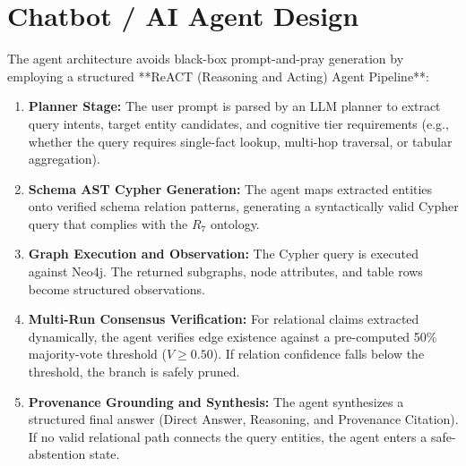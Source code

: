 \documentclass[12pt,a4paper,oneside]{report}
\begin{document}
\section{Chatbot / AI Agent Design}
The agent architecture avoids black-box prompt-and-pray generation by employing a structured **ReACT (Reasoning and Acting) Agent Pipeline**:
\begin{enumerate}
    \item \textbf{Planner Stage:} The user prompt is parsed by an LLM planner to extract query intents, target entity candidates, and cognitive tier requirements (e.g., whether the query requires single-fact lookup, multi-hop traversal, or tabular aggregation).
    \item \textbf{Schema AST Cypher Generation:} The agent maps extracted entities onto verified schema relation patterns, generating a syntactically valid Cypher query that complies with the $R_7$ ontology.
    \item \textbf{Graph Execution and Observation:} The Cypher query is executed against Neo4j. The returned subgraphs, node attributes, and table rows become structured observations.
    \item \textbf{Multi-Run Consensus Verification:} For relational claims extracted dynamically, the agent verifies edge existence against a pre-computed 50\% majority-vote threshold ($V \ge 0.50$). If relation confidence falls below the threshold, the branch is safely pruned.
    \item \textbf{Provenance Grounding and Synthesis:} The agent synthesizes a structured final answer (Direct Answer, Reasoning, and Provenance Citation). If no valid relational path connects the query entities, the agent enters a safe-abstention state.
\end{enumerate}
\end{document}

